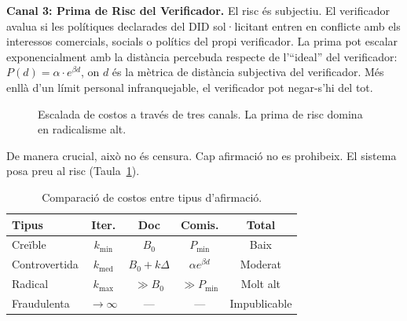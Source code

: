 \documentclass[11pt,a4paper,twocolumn]{article}
\begin{document}
\textbf{Canal 3: Prima de Risc del Verificador.} El risc és subjectiu. El verificador avalua si les polítiques declarades del DID sol·licitant entren en conflicte amb els interessos comercials, socials o polítics del propi verificador. La prima pot escalar exponencialment amb la distància percebuda respecte de l'``ideal'' del verificador: $P(d) = \alpha \cdot e^{\beta d}$, on $d$ és la mètrica de distància subjectiva del verificador. Més enllà d'un límit personal infranquejable, el verificador pot negar-s'hi del tot.

\begin{figure}[ht]
\centering
{}
\caption{Escalada de costos a través de tres canals. La prima de risc domina en radicalisme alt.}
\label{fig:radicalism}
\end{figure}

De manera crucial, això no és censura. Cap afirmació no es prohibeix. El sistema posa preu al risc (Taula~\ref{tab:costs}).

\begin{table}[ht]
\centering
\caption{Comparació de costos entre tipus d'afirmació.}
\label{tab:costs}
\footnotesize
\begin{tabular}{@{}lcccc@{}}
\toprule
\textbf{Tipus} & \textbf{Iter.} & \textbf{Doc} & \textbf{Comis.} & \textbf{Total} \\
\midrule
Creïble & $k_{\min}$ & $B_0$ & $P_{\min}$ & Baix \\
Controvertida & $k_{\text{med}}$ & $B_0{+}k\Delta$ & $\alpha e^{\beta d}$ & Moderat \\
Radical & $k_{\max}$ & $\gg B_0$ & $\gg P_{\min}$ & Molt alt \\
Fraudulenta & $\to\infty$ & --- & --- & Impublicable \\
\bottomrule
\end{tabular}
\end{table}
\end{document}
